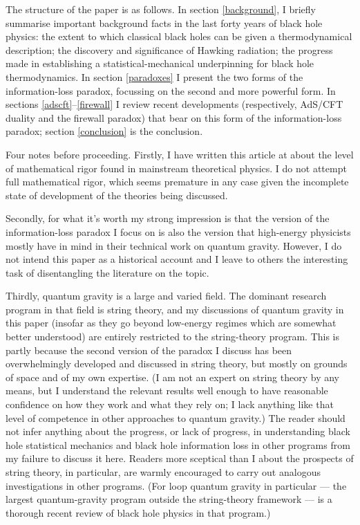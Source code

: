 \documentclass[12pt]{article}
\begin{document}
The structure of the paper is as follows. In section \ref{background}, I briefly summarise important background facts in the last forty years of black hole physics: the extent to which classical black holes can be given a thermodynamical description; the discovery and significance of Hawking radiation; the progress made in establishing a statistical-mechanical underpinning for black hole thermodynamics.  In section \ref{paradoxes} I present the two forms of the information-loss paradox, focussing on the second and more powerful form. In sections \ref{adscft}--\ref{firewall} I review recent developments (respectively, AdS/CFT duality and the firewall paradox) that bear on this form of the information-loss paradox; section \ref{conclusion} is the conclusion.

Four notes before proceeding. Firstly, I have written this article at about the level of mathematical rigor found in mainstream theoretical physics. I do not attempt full mathematical rigor, which seems premature in any case given the incomplete state of development of the theories being discussed. 

Secondly, for what it's worth my strong impression is that the version of the information-loss paradox I focus on is also the version that high-energy physicists mostly have in mind in their technical work on quantum gravity. However, I do not intend this paper as a historical account and I leave to others the interesting task of disentangling the literature on the topic. 

Thirdly, quantum gravity is a large and varied field. The dominant research program in that field is string theory, and my discussions of quantum gravity in this paper (insofar as they go beyond low-energy regimes which are somewhat better understood) are entirely restricted to the string-theory program. This is partly because the second version of the paradox I discuss has been overwhelmingly developed and discussed in string theory, but mostly on grounds of space and of my own expertise. (I am not an expert on string theory by any means, but I understand the relevant results well enough to have reasonable confidence on how they work and what they rely on; I lack anything like that level of competence in other approaches to quantum gravity.) The reader should not infer anything about the progress, or lack of progress, in understanding black hole statistical mechanics and black hole information loss in other programs from my failure to discuss it here. Readers more sceptical than I about the prospects of string theory, in particular, are warmly encouraged to carry out analogous investigations in other programs. (For loop quantum gravity in particular --- the largest quantum-gravity program outside the string-theory framework ---  is a thorough recent review of black hole physics in that program.) 
\end{document}
